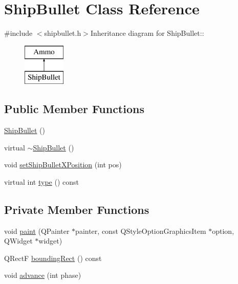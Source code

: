 \hypertarget{class_ship_bullet}{
\section{ShipBullet Class Reference}
\label{class_ship_bullet}
}


{\ttfamily \#include $<$shipbullet.h$>$}Inheritance diagram for ShipBullet::\begin{figure}[H]
\begin{center}
\leavevmode
\includegraphics[height=2cm]{class_ship_bullet}
\end{center}
\end{figure}
\subsection*{Public Member Functions}
\begin{DoxyCompactItemize}
\item 
\hyperlink{class_ship_bullet_a1cce0c8b6a00a834e18f709b44e787d5}{ShipBullet} ()
\item 
virtual \hyperlink{class_ship_bullet_aa315ad339632eabf0121e761084a1d87}{$\sim$ShipBullet} ()
\item 
void \hyperlink{class_ship_bullet_a8953a899414d57e0834c8aa98e5d3b70}{setShipBulletXPosition} (int pos)
\item 
virtual int \hyperlink{class_ship_bullet_a9645812da4c374f7e759c00c39cb01aa}{type} () const 
\end{DoxyCompactItemize}
\subsection*{Private Member Functions}
\begin{DoxyCompactItemize}
\item 
void \hyperlink{class_ship_bullet_a44c9cf7ab35d5fe69402226b341e2593}{paint} (QPainter $\ast$painter, const QStyleOptionGraphicsItem $\ast$option, QWidget $\ast$widget)
\item 
QRectF \hyperlink{class_ship_bullet_ab2a2a467deb5546778e5f052705959dd}{boundingRect} () const 
\item 
void \hyperlink{class_ship_bullet_ad2b81da446941edb9ec54a7603ed1212}{advance} (int phase)
\end{DoxyCompactItemize}
